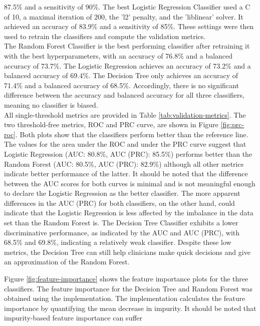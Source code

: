 87.5\% and a 
sensitivity of 90\%. The best Logistic Regression Classifier used a C of 10, a 
maximal iteration of 200, the 'l2' penalty, and the 'liblinear' solver. It 
achieved an accuracy 
of 83.9\% and a sensitivity of 85\%. These settings were then used to retrain 
the classifiers and compute the validation metrics.
\\
The Random Forest Classifier is the best performing classifier after 
retraining it with the best hyperparameters, with an accuracy of 76.8\% and a 
balanced accuracy of 73.7\%. The Logistic Regression achieves an accuracy of 
73.2\% and a balanced accuracy of 69.4\%. The Decision Tree only 
achieves an accuracy of 71.4\% and a balanced accuracy of 68.5\%. 
Accordingly, there is no significant difference between the accuracy and 
balanced accuracy for all three classifiers, meaning no classifier is biased.
\\
All single-threshold metrics are provided in Table \ref{tab:validation-metrics}.
The two threshold-free metrics, ROC and PRC curve, are shown in Figure 
\ref{fig:prc-roc}. Both plots show that the classifiers perform better than the 
reference line. The values for the area under the ROC and under the PRC curve 
suggest that Logistic Regression (AUC: 80.8\%, AUC (PRC): 85.5\%) performs 
better than the Random Forest (AUC: 80.5\%, AUC (PRC): 82.9\%) although all 
other metrics indicate better performance of the latter. It 
should be noted that the difference between the AUC scores for both curves is 
minimal and is not meaningful enough to declare the Logistic Regression as the 
better classifier. The more apparent differences in the AUC (PRC) for both 
classifiers, on the other hand, could indicate that the Logistic Regression is 
less affected by the imbalance in the data set than the Random Forest is.
The Decision Tree Classifier exhibits a lower discriminative performance,
as indicated by the AUC and AUC (PRC), with 68.5\% and 69.8\%, 
indicating a relatively weak classifier. Despite these low metrics, the 
Decision Tree can still help clinicians make quick decisions and give an 
approximation of the Random Forest.
\par
Figure \ref{fig:feature-importance} shows the feature importance plots for the 
three classifiers. The feature importance for the Decision Tree and Random 
Forest was obtained using the  implementation. The implementation 
calculates 
the feature importance by quantifying the mean decrease in impurity. 
It should be noted that impurity-based feature importance can suffer 
